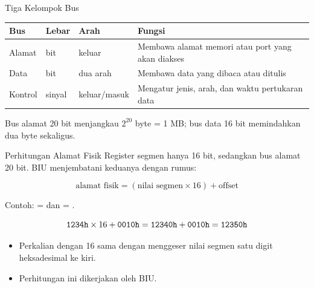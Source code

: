\documentclass[aspectratio=169,11pt]{beamer}
\begin{document}
\begin{frame}{Tiga Kelompok Bus}
\footnotesize
\begin{center}
\begin{tabular}{@{}>{\raggedright\arraybackslash}p{2.2cm}
    >{\raggedright\arraybackslash}p{1.8cm}
    >{\raggedright\arraybackslash}p{2.2cm}
    >{\raggedright\arraybackslash}p{5.8cm}@{}}
    \toprule
    \textbf{Bus} & \textbf{Lebar} & \textbf{Arah} &
    \textbf{Fungsi} \\
    \midrule
    Alamat & 20 bit & keluar & Membawa alamat memori atau port
    yang akan diakses \\
    \addlinespace
    Data & 16 bit & dua arah & Membawa data yang dibaca atau
    ditulis \\
    \addlinespace
    Kontrol & sinyal & keluar/masuk & Mengatur jenis, arah, dan
    waktu pertukaran data \\
    \bottomrule
\end{tabular}
\end{center}

\vspace{0.25em}
{\color{obeGray}Bus alamat 20 bit menjangkau $2^{20}$ byte = 1 MB;
bus data 16 bit memindahkan dua byte sekaligus.\par}
\end{frame}

\begin{frame}{Perhitungan Alamat Fisik}
\small
Register segmen hanya 16 bit, sedangkan bus alamat 20 bit. BIU
menjembatani keduanya dengan rumus:

\[
\text{alamat fisik} = (\text{nilai segmen} \times 16)
+ \text{offset}
\]

Contoh:  =  dan  = .

\[
\texttt{1234h} \times 16 + \texttt{0010h}
= \texttt{12340h} + \texttt{0010h} = \texttt{12350h}
\]

\begin{itemize}
    \item Perkalian dengan 16 sama dengan menggeser nilai segmen
          satu digit heksadesimal ke kiri.
    \item Perhitungan ini dikerjakan oleh BIU.
\end{itemize}
\end{frame}
\end{document}
